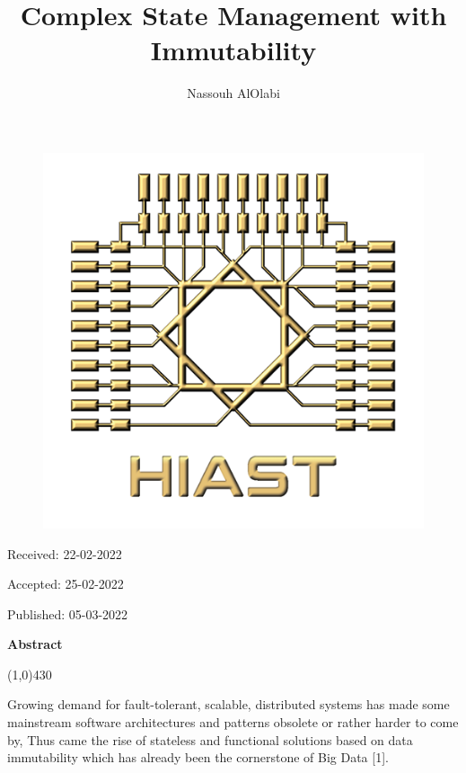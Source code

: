 \documentclass[12pt,twoside]{article}
\title{\Huge{Complex State Management with Immutability}}
\author{Nassouh AlOlabi} \affil{Supervised By: Dr.Yasser Rahal, Fahmi Alammareen}
\date{}
\makeatletter
\def\maketitle{{%
		\renewenvironment{tabular}[2][]
		{\begin{flushleft}}
			{\end{flushleft}}
		\AB@maketitle}}
\makeatother
\begin{document}

\begin{figure}
    {\includegraphics[scale=.25]{logo.png}}
\end{figure}

\maketitle

\thispagestyle{first}

\vspace{0.5cm}

\hfill Received: 22-02-2022 

\hfill Accepted: 25-02-2022

\hfill Published: 05-03-2022

\vspace{1cm}


\vspace{1.5cm}

\noindent \textbf{Abstract}
\begin{center}
 	\line(1,0){430}
\end{center}
\vspace{-0,3cm}
\noindent Growing demand for fault-tolerant, scalable, distributed systems has made some mainstream software architectures and patterns obsolete or rather harder to come by, Thus came the rise of stateless and functional solutions based on data immutability which has already been the cornerstone of Big Data [1].
\end{document}

